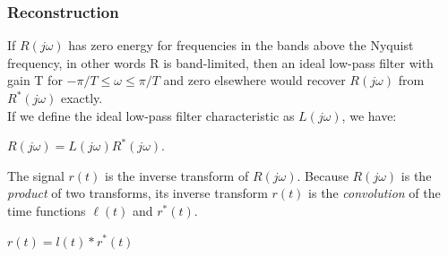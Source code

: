 \begin{frame}
	\frametitle{Reconstruction}
	If $R(j\omega)$ has zero energy for frequencies in the bands above the Nyquist frequency, in other words R is band-limited, then an ideal low-pass filter with gain T for $-\pi/T \leq \omega \leq \pi/T$ and zero elsewhere would recover $R(j\omega)$ from $R^*(j\omega)$ exactly.\\
	\medskip
	If we define the ideal low-pass filter characteristic as $L(j\omega)$, we have:
	\begin{center}
		$R(j\omega)=L(j\omega)R^*(j\omega)$.
	\end{center}
	The signal $r(t)$ is the inverse transform of $R(j\omega)$. Because $R(j\omega)$ is the \textit{product} of two transforms, its inverse transform $r(t)$ is the \textit{convolution} of the time functions $\ell(t)$ and $r^*(t)$.\\
	\begin{center}
		$r(t) = l(t) * r^*(t)$
	\end{center}
\end{frame}

